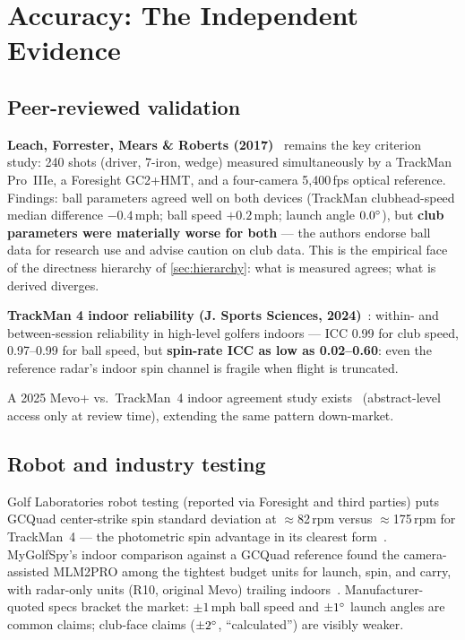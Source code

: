 \chapter{Accuracy: The Independent Evidence}
\label{ch:accuracy}

\section{Peer-reviewed validation}

\textbf{Leach, Forrester, Mears \& Roberts (2017)}~\cite{leach2017}
remains the key criterion study: 240 shots (driver, 7-iron, wedge)
measured simultaneously by a TrackMan Pro~IIIe, a Foresight GC2+HMT, and
a four-camera 5,400\,fps optical reference. Findings: ball parameters
agreed well on both devices (TrackMan clubhead-speed median difference
$-0.4$\,mph; ball speed $+0.2$\,mph; launch angle $0.0\si{\degree}$), but
\textbf{club parameters were materially worse for both} --- the authors
endorse ball data for research use and advise caution on club data. This
is the empirical face of the directness hierarchy of
\cref{sec:hierarchy}: what is measured agrees; what is derived diverges.

\textbf{TrackMan 4 indoor reliability (J. Sports Sciences,
2024)}~\cite{tm4reliability}: within- and between-session reliability in
high-level golfers indoors --- ICC 0.99 for club speed, 0.97--0.99 for
ball speed, but \textbf{spin-rate ICC as low as 0.02--0.60}: even the
reference radar's indoor spin channel is fragile when flight is
truncated.

A 2025 Mevo+ vs.\ TrackMan~4 indoor agreement study
exists~\cite{mevoplusstudy} (abstract-level access only at review time),
extending the same pattern down-market.

\section{Robot and industry testing}

Golf Laboratories robot testing (reported via Foresight and third
parties) puts GCQuad center-strike spin standard deviation at
$\approx$82\,rpm versus $\approx$175\,rpm for TrackMan~4 --- the
photometric spin advantage in its clearest form~\cite{golflabsrobot}.
MyGolfSpy's indoor comparison against a GCQuad reference found the
camera-assisted MLM2PRO among the tightest budget units for launch,
spin, and carry, with radar-only units (R10, original Mevo) trailing
indoors~\cite{mygolfspyindoor}. Manufacturer-quoted specs bracket the
market: $\pm1$\,mph ball speed and $\pm1\si{\degree}$ launch angles are common
claims; club-face claims ($\pm2\si{\degree}$, ``calculated'') are visibly
weaker.

